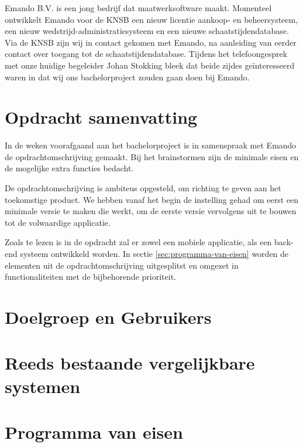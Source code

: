 Emando B.V. is een jong bedrijf dat maatwerksoftware maakt. Momenteel ontwikkelt Emando voor de \ac{KNSB} een nieuw licentie aankoop- en beheersysteem, een nieuw wedstrijd-administratiesysteem en een nieuwe schaatstijdendatabase. Via de \ac{KNSB} zijn wij in contact gekomen met Emando, na aanleiding van eerder contact over toegang tot de schaatstijdendatabase. Tijdens het telefoongesprek met onze huidige begeleider Johan Stokking bleek dat beide zijdes geïnteresseerd waren in dat wij ons bachelorproject zouden gaan doen bij Emando.

\section{Opdracht samenvatting}
In de weken voorafgaand aan het bachelorproject is in samenspraak met Emando de opdrachtomschrijving gemaakt. Bij het brainstormen zijn de minimale eisen en de mogelijke extra functies bedacht. 



De opdrachtomschrijving is ambiteus opgesteld, om richting te geven aan het toekomstige product. We hebben vanaf het begin de instelling gehad om eerst een minimale versie te maken die werkt, om de eerste versie vervolgens uit te bouwen tot de volwaardige applicatie.

Zoals te lezen is in de opdracht zal er zowel een mobiele applicatie, als een back-end systeem ontwikkeld worden. In sectie \ref{sec:programma-van-eisen} worden de elementen uit de opdrachtomschrijving uitgesplitst en omgezet in functionaliteiten met de bijbehorende prioriteit.

\section{Doelgroep en Gebruikers}



\section{Reeds bestaande vergelijkbare systemen}


    
\section{Programma van eisen} %



